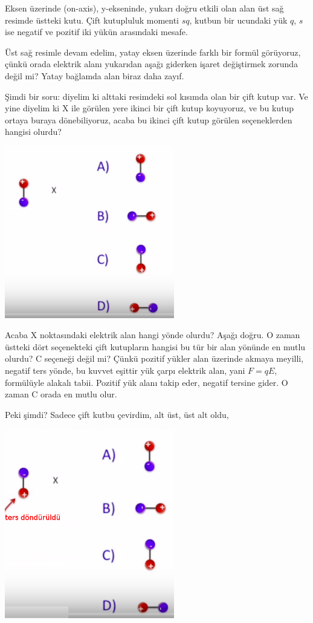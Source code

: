 \documentclass[12pt,fleqn]{article}\usepackage{../../common}
\begin{document}
Eksen üzerinde (on-axis), y-ekseninde, yukarı doğru etkili olan alan üst sağ
resimde üstteki kutu. Çift kutupluluk momenti $sq$, kutbun bir ucundaki yük $q$,
$s$ ise negatif ve pozitif iki yükün arasındaki mesafe.

Üst sağ resimle devam edelim, yatay eksen üzerinde farklı bir formül görüyoruz,
çünkü orada elektrik alanı yukarıdan aşağı giderken işaret değiştirmek zorunda
değil mi? Yatay bağlamda alan biraz daha zayıf.

Şimdi bir soru: diyelim ki alttaki resimdeki sol kısımda olan bir çift kutup
var. Ve yine diyelim ki X ile görülen yere ikinci bir çift kutup koyuyoruz,
ve bu kutup ortaya buraya dönebiliyoruz, acaba bu ikinci çift kutup görülen
seçeneklerden hangisi olurdu? 

\includegraphics[width=20em]{04_03.png}

Acaba X noktasındaki elektrik alan hangi yönde olurdu? Aşağı doğru. O zaman
üstteki dört seçenekteki çift kutupların hangisi bu tür bir alan yönünde en
mutlu olurdu? C seçeneği değil mi? Çünkü pozitif yükler alan üzerinde akmaya
meyilli, negatif ters yönde, bu kuvvet eşittir yük çarpı elektrik alan, yani
$F=qE$, formülüyle alakalı tabii. Pozitif yük alanı takip eder, negatif tersine
gider. O zaman C orada en mutlu olur. 

Peki şimdi? Sadece çift kutbu çevirdim, alt üst, üst alt oldu, 

\includegraphics[width=20em]{04_04.png}
\end{document}
